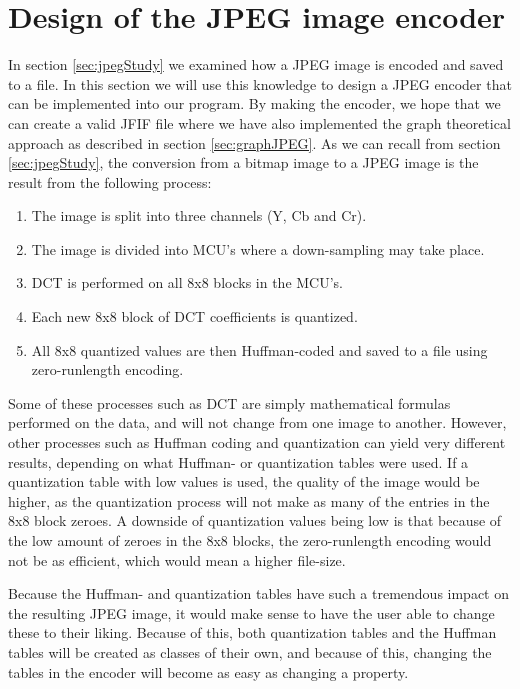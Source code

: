 \section{Design of the JPEG image encoder}
\label{sec:designJPEG}
In section \ref{sec:jpegStudy} we examined how a JPEG image is encoded and saved to a file.
In this section we will use this knowledge to design a JPEG encoder that can be implemented into our program.
By making the encoder, we hope that we can create a valid JFIF file where we have also implemented the graph theoretical approach as described in section \ref{sec:graphJPEG}.
As we can recall from section \ref{sec:jpegStudy}, the conversion from a bitmap image to a JPEG image is the result from the following process:

\begin{enumerate}
	\item The image is split into three channels (Y, Cb and Cr).
	\item The image is divided into MCU's where a down-sampling may take place.
	\item DCT is performed on all 8x8 blocks in the MCU's.
	\item Each new 8x8 block of DCT coefficients is quantized.
	\item All 8x8 quantized values are then Huffman-coded and saved to a file using zero-runlength encoding.
\end{enumerate}

Some of these processes such as DCT are simply mathematical formulas performed on the data, and will not change from one image to another.
However, other processes such as Huffman coding and quantization can yield very different results, depending on what Huffman- or quantization tables were used.
If a quantization table with low values is used, the quality of the image would be higher, as the quantization process will not make as many of the entries in the 8x8 block zeroes.
A downside of quantization values being low is that because of the low amount of zeroes in the 8x8 blocks, the zero-runlength encoding would not be as efficient, which would mean a higher file-size.

Because the Huffman- and quantization tables have such a tremendous impact on the resulting JPEG image, it would make sense to have the user able to change these to their liking.
Because of this, both quantization tables and the Huffman tables will be created as classes of their own, and because of this, changing the tables in the encoder will become as easy as changing a property.

